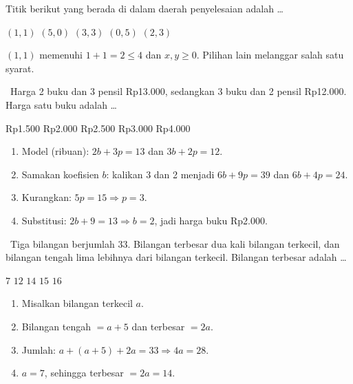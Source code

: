 \documentclass[11pt,a4paper]{exam}
\newenvironment{langkah}{%
  \begin{enumerate}[label=\textbf{Langkah \arabic*:},leftmargin=2.6em,
    itemsep=2pt,topsep=2pt]}{\end{enumerate}}
\newcommand{\Adv}{{\footnotesize\textsf{\textcolor{oranye}{[Advanced]}}}\ }
\begin{document}
\begin{questions}
Titik berikut yang berada di dalam daerah penyelesaian adalah \dots
\begin{choices}
\CorrectChoice $(1,1)$ \choice $(5,0)$ \choice $(3,3)$ \choice $(0,5)$ \choice $(2,3)$
\end{choices}
\begin{solution}$(1,1)$ memenuhi $1+1=2\le 4$ dan $x,y\ge 0$. Pilihan lain melanggar
salah satu syarat.\end{solution}

\question \Adv Harga 2 buku dan 3 pensil Rp13.000, sedangkan 3 buku dan 2 pensil
Rp12.000. Harga satu buku adalah \dots
\begin{choices}
\choice Rp1.500 \CorrectChoice Rp2.000 \choice Rp2.500 \choice Rp3.000 \choice Rp4.000
\end{choices}
\begin{solution}
\begin{langkah}
\item Model (ribuan): $2b+3p=13$ dan $3b+2p=12$.
\item Samakan koefisien $b$: kalikan 3 dan 2 menjadi $6b+9p=39$ dan $6b+4p=24$.
\item Kurangkan: $5p = 15 \Rightarrow p = 3$.
\item Substitusi: $2b + 9 = 13 \Rightarrow b = 2$, jadi harga buku Rp2.000.
\end{langkah}
\end{solution}

\question \Adv Tiga bilangan berjumlah 33. Bilangan terbesar dua kali bilangan
terkecil, dan bilangan tengah lima lebihnya dari bilangan terkecil. Bilangan
terbesar adalah \dots
\begin{choices}
\choice $7$ \choice $12$ \CorrectChoice $14$ \choice $15$ \choice $16$
\end{choices}
\begin{solution}
\begin{langkah}
\item Misalkan bilangan terkecil $a$.
\item Bilangan tengah $= a+5$ dan terbesar $= 2a$.
\item Jumlah: $a + (a+5) + 2a = 33 \Rightarrow 4a = 28$.
\item $a = 7$, sehingga terbesar $= 2a = 14$.
\end{langkah}
\end{solution}


\end{questions}
\end{document}
